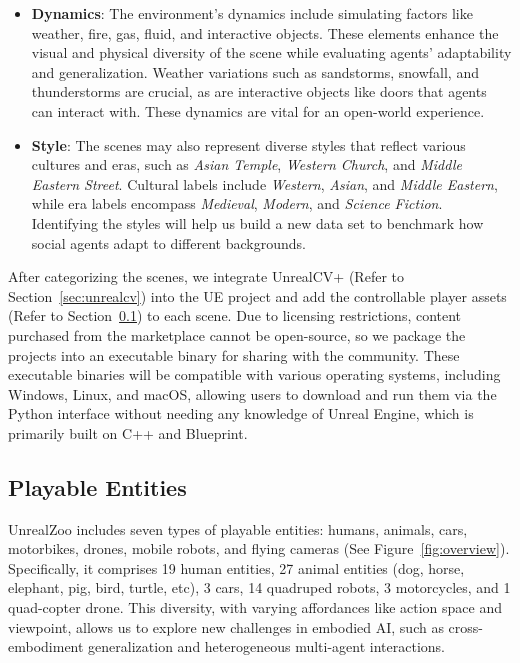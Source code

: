 \documentclass{article}
\begin{document}
\begin{itemize}
    \item \textbf{Dynamics}: The environment's dynamics include simulating factors like weather,  fire, gas, fluid, and interactive objects. These elements enhance the visual and physical diversity of the scene while evaluating agents' adaptability and generalization. Weather variations such as sandstorms, snowfall, and thunderstorms are crucial, as are interactive objects like doors that agents can interact with. These dynamics are vital for an open-world experience.
    \item \textbf{Style}: The scenes may also represent diverse styles that reflect various cultures and eras, such as \emph{Asian Temple}, \emph{Western Church}, and \emph{Middle Eastern Street}. Cultural labels include \emph{Western}, \emph{Asian}, and \emph{Middle Eastern}, while era labels encompass \emph{Medieval}, \emph{Modern}, and \emph{Science Fiction}. Identifying the styles will help us build a new data set to benchmark how social agents adapt to different backgrounds.
\end{itemize}

After categorizing the scenes, we integrate UnrealCV+ (Refer to Section~\ref{sec:unrealcv}) into the UE project and add the controllable player assets (Refer to Section~\ref{sec:body}) to each scene. Due to licensing restrictions, content purchased from the marketplace cannot be open-source, so we package the projects into an executable binary for sharing with the community. These executable binaries will be compatible with various operating systems, including Windows, Linux, and macOS, allowing users to download and run them via the Python interface without needing any knowledge of Unreal Engine, which is primarily built on C++ and Blueprint.



\subsection{Playable Entities}
\label{sec:body}

UnrealZoo includes seven types of playable entities: humans, animals, cars, motorbikes, drones, mobile robots, and flying cameras (See Figure~\ref{fig:overview}). Specifically, it comprises 19 human entities, 27 animal entities (dog, horse, elephant, pig, bird, turtle, etc), 3 cars, 14 quadruped robots, 3 motorcycles, and 1 quad-copter drone. This diversity, with varying affordances like action space and viewpoint, allows us to explore new challenges in embodied AI, such as cross-embodiment generalization and heterogeneous multi-agent interactions.
\end{document}
